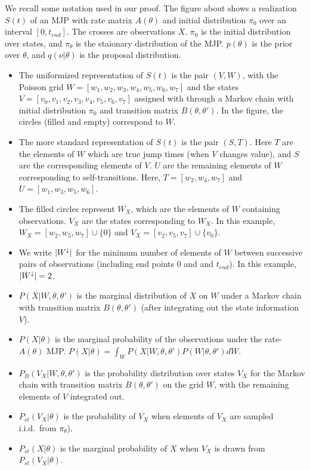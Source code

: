 {We recall some notation used in our proof. 
  The figure about shows a realization $S(t)$ of an MJP with rate matrix 
  $A(\theta)$ and initial distribution $\pi_0$ over an interval 
  $[0,t_{end}]$. The crosses are observations $X$. $\pi_0$ is the initial 
  distribution over states, and $\pi_\theta$ is the staionary distribution 
  of the MJP.
    $p(\theta)$ is the prior over $\theta$, and $q(\nu|\theta)$ is 
      the proposal distribution.
  \begin{itemize}
    \item The uniformized representation of $S(t)$ is the pair 
      $(V, W)$, with the Poisson grid 
      $W = [w_1, w_2, w_3, w_4, w_5, w_6, w_7]$ and the states 
      $V =[v_0, v_1, v_2, v_3, v_4, v_5, v_6, v_7]$ assigned with through 
      a Markov chain with initial distribution $\pi_0$ and transition 
      matrix $B(\theta,\theta')$. In the figure, the circles (filled and 
      empty) correspond to $W$.
    \item The more standard representation of $S(t)$ is the pair $(S,T)$.
      Here $T$ are the elements of $W$ which are true jump times (when 
      $V$ changes value), and $S$ are the corresponding elements of $V$.
      $U$ are the remaining elements of $W$ corresponding to self-transitions.
      Here, $T = [w_2, w_4, w_7]$ and $U = [w_1, w_3,  w_5, w_6]$. 
    \item The filled circles represent $W_X$, which are the elements of 
      $W$ containing observations. $V_X$ are the states corresponding to 
      $W_X$. In this example, $W_X = [w_2, w_5,w_7] \cup {\{0\}}$ and 
      $V_X = [v_2, v_5, v_7] \cup {\{v_0\}}$. 
    \item We write ${|W^\downarrow}|$ for the minimum number of elements of $W$ between 
      successive pairs of observations (including end points $0$ and 
      and $t_{end}$). In this example, ${|W^\downarrow}| = 2$. 
    \item $P(X | W, \theta, \theta')$ is the marginal distribution of 
      $X$ on $W$ under a Markov chain with 
      transition matrix $B(\theta, \theta')$ (after integrating out the 
      state information $V$). 
    \item $P(X|\theta)$ is the marginal probability of the 
      observations under the rate-$A(\theta)$ MJP. 
$P(X | \theta) =  \int_W P(X | W, \theta, \theta') P(W|\theta, \theta')dW$.
    \item $P_B(V_X | W, \theta, \theta')$ is the probability 
      distribution over states $V_X$ for the Markov chain with 
      transition matrix $B(\theta, \theta')$ on the grid $W$, with the remaining elements 
      of $V$ integrated out. 
    \item  $P_{st}(V_X|\theta)$ is the probability of $V_X$ when 
      elements of $V_X$ are sampled i.i.d.\ from $\pi_\theta$).
    \item  $P_{st}(X|\theta)$ is the marginal probability of $X$
      when $V_X$ is drawn from $P_{st}(V_X|\theta)$.
  \end{itemize}
} 
